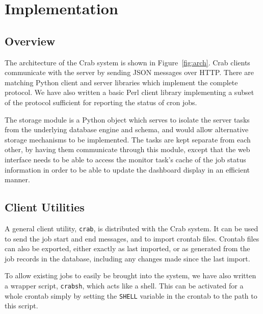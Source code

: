 \section{Implementation}

\subsection{Overview}


The architecture of the Crab system is
shown in Figure~\ref{fig:arch}.
Crab clients communicate with the server
by sending JSON messages over HTTP.
There are matching Python client and server libraries
which implement the complete protocol.
We have also written a basic Perl client library implementing
a subset of the protocol sufficient for 
reporting the status of cron jobs.

The storage module is a Python object which serves to isolate the
server tasks from the underlying database engine and schema, and would
allow alternative storage mechanisms to be implemented.
The tasks are kept separate from each other, by having them communicate
through this module, except that the web interface needs to be
able to access the monitor task's cache of the job status information
in order to be able to update the dashboard display in
an efficient manner.

\subsection{Client Utilities}


A general client utility, \texttt{crab},
is distributed with the Crab system.
It can be used to send the job start
and end messages, and to import crontab files.
Crontab files can also be exported,
either exactly as last imported,
or as generated from the job records in the database,
including any changes made since the last
import.

To allow existing jobs to easily
be brought into the system,
we have also written a wrapper script, \texttt{crabsh}, which acts
like a shell.
This can be activated for a whole crontab 
simply by setting the \texttt{SHELL}
variable in the crontab to the path to this script.


